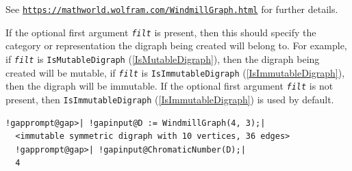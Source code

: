 \documentclass[a4paper,11pt]{report}
\begin{document}
{{{ See \href{https://mathworld.wolfram.com/WindmillGraph.html} {\texttt{https://mathworld.wolfram.com/WindmillGraph.html}} for further details.

 If the optional first argument \mbox{\texttt{\mdseries\slshape filt}} is present, then this should specify the category or representation the
digraph being created will belong to. For example, if \mbox{\texttt{\mdseries\slshape filt}} is \texttt{IsMutableDigraph} (\ref{IsMutableDigraph}), then the digraph being created will be mutable, if \mbox{\texttt{\mdseries\slshape filt}} is \texttt{IsImmutableDigraph} (\ref{IsImmutableDigraph}), then the digraph will be immutable. If the optional first argument \mbox{\texttt{\mdseries\slshape filt}} is not present, then \texttt{IsImmutableDigraph} (\ref{IsImmutableDigraph}) is used by default.

 
\begin{Verbatim}[commandchars=!@|,fontsize=\small,frame=single,label=Example]
  !gapprompt@gap>| !gapinput@D := WindmillGraph(4, 3);|
  <immutable symmetric digraph with 10 vertices, 36 edges>
  !gapprompt@gap>| !gapinput@ChromaticNumber(D);|
  4
\end{Verbatim}
 }

 }

 }

 
\end{document}
